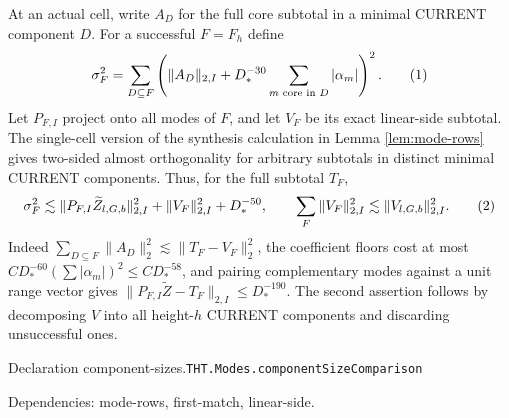 \documentclass[11pt]{article}
\theoremstyle{definition}
\newcommand{\eqtag}[1]{\refstepcounter{equation}\tag{\theequation}\label{#1}}
\numberwithin{equation}{section}
\newcommand{\bp}[3]{\par\smallskip\begingroup\footnotesize
\noindent\hypertarget{bp:#1}{\textsf{Declaration #1.}}\quad\nolinkurl{#2}\par
\noindent\textsf{Dependencies:} #3.\par\endgroup\smallskip}
\begin{document}
At an actual cell, write $A_D$ for the full core subtotal in a minimal CURRENT component $D$. For a successful $F=F_h$ define
\[
 \sigma_F^2=\sum_{D\subseteq F}
 \left(\|A_D\|_{2,I}+D_*^{-30}\sum_{m\text{ core in }D}|\alpha_m|\right)^2.
 \eqtag{eq:component-size}
\]
Let $P_{F,I}$ project onto all modes of $F$, and let $V_F$ be its exact linear-side subtotal. The single-cell version of the synthesis calculation in Lemma \ref{lem:mode-rows} gives two-sided almost orthogonality for arbitrary subtotals in distinct minimal CURRENT components. Thus, for the full subtotal $T_F$,
\[
 \sigma_F^2\lesssim\|P_{F,I}\widetilde Z_{l,G,b}\|_{2,I}^2+\|V_F\|_{2,I}^2+D_*^{-50},
 \qquad \sum_F\|V_F\|_{2,I}^2\lesssim\|V_{l,G,b}\|_{2,I}^2.
 \eqtag{eq:size-comparison}
\]
Indeed $\sum_{D\subseteq F}\|A_D\|_2^2\lesssim\|T_F-V_F\|_2^2$, the coefficient floors cost at most $CD_*^{-60}(\sum|\alpha_m|)^2\le CD_*^{-58}$, and pairing complementary modes against a unit range vector gives $\|P_{F,I}\widetilde Z-T_F\|_{2,I}\le D_*^{-190}$. The second assertion follows by decomposing $V$ into all height-$h$ CURRENT components and discarding unsuccessful ones. 

\bp{component-sizes}{THT.Modes.componentSizeComparison}{mode-rows, first-match, linear-side}
\end{document}
